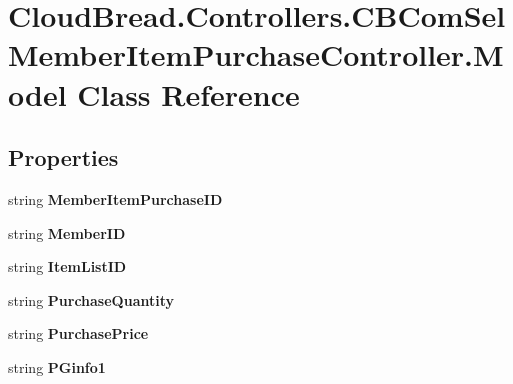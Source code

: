\hypertarget{a00153}{}\section{Cloud\+Bread.\+Controllers.\+C\+B\+Com\+Sel\+Member\+Item\+Purchase\+Controller.\+Model Class Reference}
\label{a00153}
\subsection*{Properties}
\begin{DoxyCompactItemize}
\item 
string {\bfseries Member\+Item\+Purchase\+ID}\hypertarget{a00153_a6a972fa72f6521542cd30dc4fdfc6ed2}{}\label{a00153_a6a972fa72f6521542cd30dc4fdfc6ed2}

\item 
string {\bfseries Member\+ID}\hypertarget{a00153_aa6d52584f90d94d0f5752312954669dd}{}\label{a00153_aa6d52584f90d94d0f5752312954669dd}

\item 
string {\bfseries Item\+List\+ID}\hypertarget{a00153_a8d002dde95b3d4322b8c602e5db97870}{}\label{a00153_a8d002dde95b3d4322b8c602e5db97870}

\item 
string {\bfseries Purchase\+Quantity}\hypertarget{a00153_a60305a2d1b730c076edcaf2014993bec}{}\label{a00153_a60305a2d1b730c076edcaf2014993bec}

\item 
string {\bfseries Purchase\+Price}\hypertarget{a00153_ada55a2c80b4cd07fdbe8b8db383cf255}{}\label{a00153_ada55a2c80b4cd07fdbe8b8db383cf255}

\item 
string {\bfseries P\+Ginfo1}\hypertarget{a00153_ae388e9ba58002494b61c46b95528fee9}{}\label{a00153_ae388e9ba58002494b61c46b95528fee9}


\end{DoxyCompactItemize}
